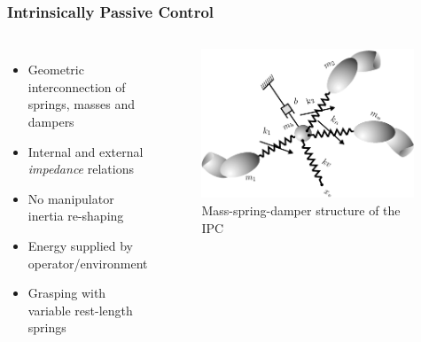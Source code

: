 \documentclass[student]{ITRslides}
\begin{document}
%			
%	
%
%		
%		
%			

\begin{frame}
	\frametitle{Intrinsically Passive Control}
\begin{columns}[t]
			
	
		\begin{itemize}
			\item Geometric interconnection of springs, masses and dampers
			\item Internal and external \emph{impedance} relations
			\item No manipulator inertia re-shaping
			\item Energy supplied by operator/environment
			\item Grasping with variable rest-length springs
		\end{itemize}

		
             \begin{figure}[htb]
			\centering
			\includegraphics[width=0.98\textwidth]{IPCsprings.png}
			\caption{Mass-spring-damper structure of the IPC 						\cite{Stramigioli_01}}
			\end{figure}
		
			
		\end{columns}
\end{frame}
\end{document}
